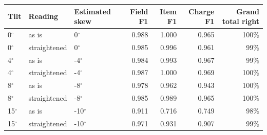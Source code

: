\begin{tabular}{@{}lllrrrr@{}}
\toprule
Tilt & Reading & Estimated skew & Field F1 & Item F1 & Charge F1 & Grand total right \\
\midrule
0$^\circ$ & as is & 0$^\circ$ & 0.988 & 1.000 & 0.965 & 100\% \\
0$^\circ$ & straightened & 0$^\circ$ & 0.985 & 0.996 & 0.961 & 99\% \\
4$^\circ$ & as is & -4$^\circ$ & 0.984 & 0.993 & 0.967 & 99\% \\
4$^\circ$ & straightened & -4$^\circ$ & 0.987 & 1.000 & 0.969 & 100\% \\
8$^\circ$ & as is & -8$^\circ$ & 0.978 & 0.962 & 0.943 & 100\% \\
8$^\circ$ & straightened & -8$^\circ$ & 0.985 & 0.989 & 0.965 & 100\% \\
15$^\circ$ & as is & -10$^\circ$ & 0.911 & 0.716 & 0.749 & 98\% \\
15$^\circ$ & straightened & -10$^\circ$ & 0.971 & 0.931 & 0.907 & 99\% \\
\bottomrule
\end{tabular}
